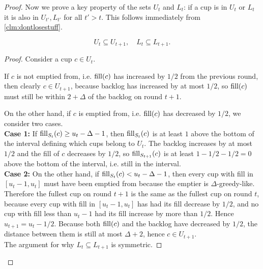 \begin{proof}
  Now we prove a key property of the sets $U_t$ and $L_t$: if a cup is in
  $U_t$ or $L_t$ it is also in $U_{t'}, L_{t'}$ for all $t' > t$. This
  follows immediately from \cref{clm:dontlosestuff}.
  \begin{clm}
    \label{clm:dontlosestuff}
    $$U_{t} \subseteq U_{t+1},\quad L_t \subseteq L_{t+1}.$$
  \end{clm}
  \begin{proof}
    Consider a cup $c\in U_t$.

    If $c$ is not emptied from, i.e. $\operatorname{\text{\textup{fill}}}(c)$ has increased by
    $1/2$ from the previous round, then
    clearly $c \in U_{t+1}$, because backlog has increased by at most $1/2$, so
    $\operatorname{\text{\textup{fill}}}(c)$ must still be within $2+\Delta$ of the backlog on round $t+1$. 

    On the other hand, if $c$ is emptied from, i.e. $\operatorname{\text{\textup{fill}}}(c)$ has decreased by
    $1/2$, we consider two cases.\\
    \textbf{Case 1:} If $\operatorname{\text{\textup{fill}}}_{S_t}(c) \ge u_t-\Delta -1$, then
    $\operatorname{\text{\textup{fill}}}_{S_t}(c)$ is at least $1$ above the bottom of the
    interval defining which cups belong to $U_t$. The backlog
    increases by at most $1/2$ and the fill of $c$ decreases by $1/2$, so
    $\operatorname{\text{\textup{fill}}}_{S_{t+1}}(c)$ is at least $1-1/2-1/2 = 0$ above the bottom of the
    interval, i.e. still in the interval. \\
    \textbf{Case 2:} On the other hand, if $\operatorname{\text{\textup{fill}}}_{S_t}(c) <
    u_t-\Delta-1$, then every cup with fill in $[u_t-1, u_t]$
    must have been emptied from because the emptier is
    $\Delta$-greedy-like. Therefore the fullest cup
    on round $t+1$ is the same as the fullest cup on round $t$,
    because every cup with fill in $[u_t-1, u_t]$
    has had its fill decrease by $1/2$, and no cup with fill less than
    $u_t-1$ had its fill increase by more than $1/2$. Hence $u_{t+1}
    = u_t -1/2$. Because both $\operatorname{\text{\textup{fill}}}(c)$ and the backlog
    have decreased by $1/2$, the distance between them is
    still at most $\Delta+2$, hence $c\in U_{t+1}$.\\
    The argument for why $L_t \subseteq L_{t+1}$ is symmetric.
  \end{proof}


\end{proof}
